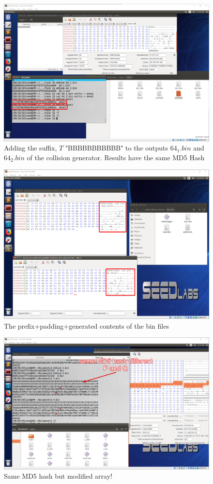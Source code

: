 \documentclass[a4paper]{article}
\begin{document}
\begin{figure}
  \includegraphics[width=\textwidth]{task2.png}
  \caption{Adding the suffix, $T$ "BBBBBBBBBBB" to the outputs $64_1.bin$ and $64_2.bin$ of the collision generator. Results have the same MD5 Hash}
  \label{task2}
\end{figure}
\begin{figure}
  \includegraphics[width=\textwidth]{task1_2.png}
  \caption{The prefix+padding+generated contents of the bin files}
\end{figure}
\begin{figure}
  \includegraphics[width=\textwidth]{task3_big.png}
  \caption{Same MD5 hash but modified array!}
  \label{task3_big}
\end{figure}
\end{document}
